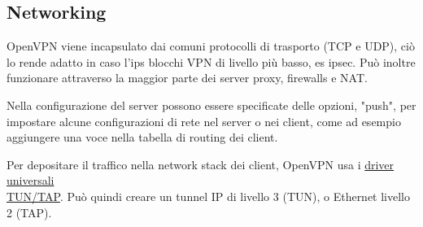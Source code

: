 \subsection{Networking}


 



OpenVPN viene incapsulato dai comuni protocolli di trasporto (TCP e UDP), ciò lo rende adatto in caso l'ips blocchi VPN di livello più basso, es ipsec. Può inoltre funzionare attraverso la maggior parte dei server proxy, firewalls e NAT.


Nella configurazione del server possono essere specificate delle opzioni, "push", per impostare alcune configurazioni di rete nel server o nei client, come ad esempio aggiungere una voce nella tabella di routing dei client.


Per depositare il traffico nella network stack dei client, OpenVPN usa i \href{https://docs.kernel.org/networking/tuntap.html}{driver universali \\TUN/TAP}. Può quindi creare un tunnel IP di livello 3 (TUN), o Ethernet livello 2 (TAP).


